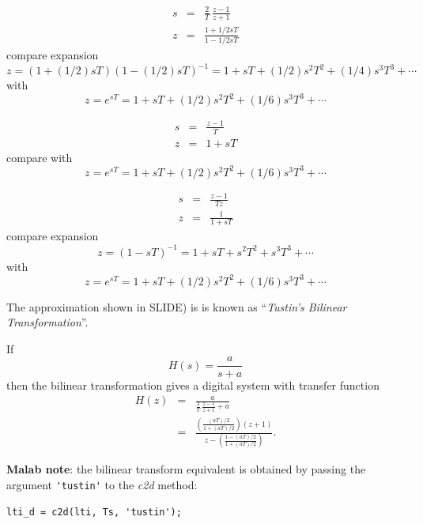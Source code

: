 \begin{slide}\label{slide:l11s22}
  
  \begin{eqnarray*}
     s &=& \frac{2}{T}\, \frac{z-1}{z+1} \\
     z &=& \frac{1 + 1/2 sT}{1 - 1/2 sT}
  \end{eqnarray*}
  compare expansion $$z=(1+ (1/2) sT)(1- (1/2) sT)^{-1} = 1 + sT + (1/2)
 s^2T^2 + (1/4) s^3T^3
 + \cdots$$  with $$z = e^{sT} = 1 + sT + (1/2) s^2T^2 + (1/6) s^3T^3 + \cdots$$
\end{slide}

\begin{slide}\label{slide:l11s20}
  
  \begin{eqnarray*}
     s &=& \frac{z-1}{T} \\
     z &=& 1 + sT
  \end{eqnarray*}
  compare with $$z = e^{sT} = 1 + sT + (1/2) s^2T^2 + (1/6) s^3T^3 + \cdots$$
\end{slide}

\begin{slide}\label{slide:l11s21}
  
  \begin{eqnarray*}
     s &=& \frac{z-1}{Tz} \\
     z &=& \frac{1}{1 + sT}
  \end{eqnarray*}
  compare expansion $$z=(1-sT)^{-1} = 1 + sT + s^2T^2 + s^3T^3
 + \cdots$$  with $$z = e^{sT} = 1 + sT + (1/2) s^2T^2 + (1/6) s^3T^3 + \cdots$$
\end{slide}


The approximation shown in SLIDE) is
is known as ``\emph{Tustin's Bilinear Transformation}''.

\begin{slide}\label{slide:l11s23}
  If \[H(s) = \frac{a}{s+a}\] then the bilinear transformation gives a
  digital system with transfer function
  \begin{eqnarray*}
    H(z)&=& \frac{a}{\frac{2}{T}\,\frac{z-1}{z+1}+a} \\
        &=& \frac{\left(\frac{(aT)/2}{1+(aT)/2}\right)(z+1)}{z-\left(\frac{1-(aT)/2}{1+(aT)/2}\right)}.
  \end{eqnarray*}
\end{slide}

\textbf{Malab note}: the bilinear transform equivalent is obtained by passing the argument \verb|'tustin'| to the \emph{c2d} method:
\begin{verbatim}
lti_d = c2d(lti, Ts, 'tustin'); 
\end{verbatim} 

